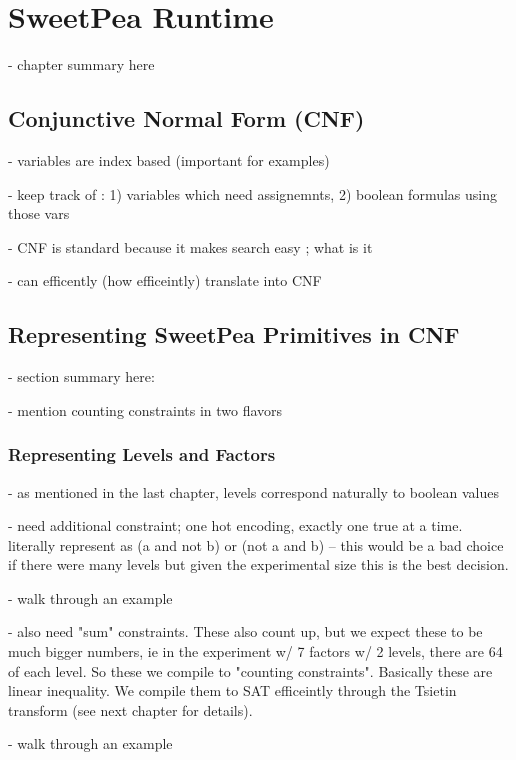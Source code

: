 
\chapter{SweetPea Runtime}

- chapter summary here

\section{Conjunctive Normal Form (CNF)}

- variables are index based (important for examples)

- keep track of : 1) variables which need assignemnts, 2) boolean formulas using those vars

- CNF is standard because it makes search easy ; what is it

- can efficently (how efficeintly) translate into CNF

\section{Representing SweetPea Primitives in CNF}

- section summary here:

- mention counting constraints in two flavors

\subsection{Representing Levels and Factors}

- as mentioned in the last chapter, levels correspond naturally to boolean values

- need additional constraint; one hot encoding, exactly one true at a time. literally represent as (a and not b) or (not a and b) -- this would be a bad choice if there were many levels but given the experimental size this is the best decision.

- walk through an example

- also need "sum" constraints. These also count up, but we expect these to be much bigger numbers, ie in the experiment w/ 7 factors w/ 2 levels, there are 64 of each level. So these we compile to "counting constraints". Basically these are linear inequality. We compile them to SAT efficeintly through the Tsietin transform (see next chapter for details).

- walk through an example


